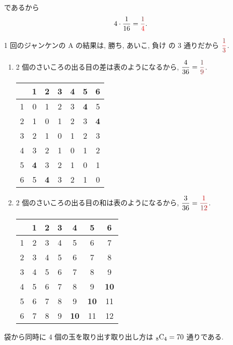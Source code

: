 \begin{qenumerate}
{\begin{enumerate}
{				であるから
				\begin{align}
					4\cdot\dfrac{1}{16} = \textcolor{red}{\dfrac{1}{4}}.
				\end{align}
			}
		\end{enumerate}
	}
	\item{
		1 回のジャンケンの A の結果は, 勝ち, あいこ, 負け の 3 通りだから $\textcolor{red}{\dfrac{1}{3}}$.
	}
	\item{
		\begin{enumerate}
			\item{
				2 個のさいころの出る目の差は表のようになるから, $\dfrac{4}{36} = \textcolor{red}{\dfrac{1}{9}}$.
				\begin{table}[H]
					\centering
					\begin{tabular}{c|cccccc}
						  & 1 & 2 & 3 & 4 & 5 & 6 \\ \hline
						1 & 0 & 1 & 2 & 3 & {\textbf{4}} & 5 \\
						2 & 1 & 0 & 1 & 2 & 3 & {\textbf{4}} \\
						3 & 2 & 1 & 0 & 1 & 2 & 3 \\
						4 & 3 & 2 & 1 & 0 & 1 & 2 \\
						5 & {\textbf{4}} & 3 & 2 & 1 & 0 & 1 \\
						6 & 5 & {\textbf{4}} & 3 & 2 & 1 & 0
					\end{tabular}
				\end{table}
			}
			\item{
				2 個のさいころの出る目の和は表のようになるから, $\dfrac{3}{36} = \textcolor{red}{\dfrac{1}{12}}$.
				\begin{table}[H]
					\centering
					\begin{tabular}{c|cccccc}
						  & 1 & 2 & 3 & 4 & 5 & 6 \\ \hline
						1 & 2 & 3 & 4 & 5 & 6 & 7 \\
						2 & 3 & 4 & 5 & 6 & 7 & 8 \\
						3 & 4 & 5 & 6 & 7 & 8 & 9 \\
						4 & 5 & 6 & 7 & 8 & 9 & {\textbf{10}} \\
						5 & 6 & 7 & 8 & 9 & {\textbf{10}} & 11 \\
						6 & 7 & 8 & 9 & {\textbf{10}} & 11 & 12
					\end{tabular}
				\end{table}
			}
		\end{enumerate}
	}
	\item{
		袋から同時に 4 個の玉を取り出す取り出し方は ${{}_{8}\mathrm{C}_{4}} = 70$ 通りである.
		\begin{enumerate}

\end{enumerate}}
\end{qenumerate}
